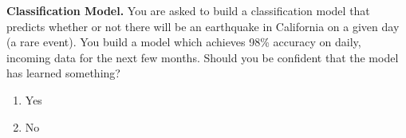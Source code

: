 \item{}
\textbf{Classification Model.}
You are asked to build a classification model that predicts whether or not there will be an earthquake in California on a given day (a rare event). You build a model which achieves 98\% accuracy on daily, incoming data for the next few months. Should you be confident that the model has learned something?

\begin{enumerate}[label=(\alph*)]
    \item Yes
    \item No
\end{enumerate} 
